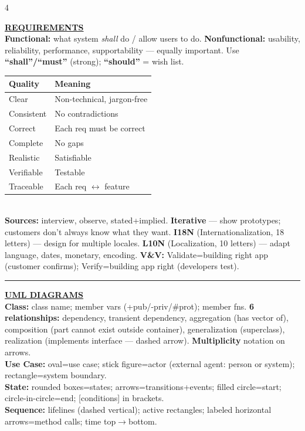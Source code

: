\documentclass[landscape,letterpaper]{article}
\newcommand{\h}[1]{\textbf{#1}}
\newcommand{\hd}[1]{\vspace{1pt}\noindent\textbf{\underline{#1}}\vspace{-1pt}}
\begin{document}
\begin{multicols}{4}
\columnbreak

\hd{REQUIREMENTS}\\[-2pt]
\h{Functional:} what system \emph{shall} do / allow users to do. \h{Nonfunctional:} usability, reliability, performance, supportability — equally important. Use \h{``shall''/``must''} (strong); \h{``should''} = wish list.\\[-2pt]
\vspace{-3pt}
{\fontsize{5.8}{6.6}\selectfont
\begin{tabular}{@{}ll@{}}
\toprule
\textbf{Quality} & \textbf{Meaning}\\
\midrule
Clear & Non-technical, jargon-free\\
Consistent & No contradictions\\
Correct & Each req must be correct\\
Complete & No gaps\\
Realistic & Satisfiable\\
Verifiable & Testable\\
Traceable & Each req $\leftrightarrow$ feature\\
\bottomrule
\end{tabular}
}\\[-2pt]
\h{Sources:} interview, observe, stated+implied. \h{Iterative} — show prototypes; customers don't always know what they want. \h{I18N} (Internationalization, 18 letters) — design for multiple locales. \h{L10N} (Localization, 10 letters) — adapt language, dates, monetary, encoding. \h{V\&V:} Validate=building right app (customer confirms); Verify=building app right (developers test).\\[-2pt]

\vspace{-1pt}\noindent\rule{\columnwidth}{0.2pt}\vspace{-3pt}

\hd{UML DIAGRAMS}\\[-2pt]
\h{Class:} class name; member vars (+pub/-priv/\#prot); member fns. \h{6 relationships:} dependency, transient dependency, aggregation (has vector of), composition (part cannot exist outside container), generalization (superclass), realization (implements interface — dashed arrow). \h{Multiplicity} notation on arrows.\\[-2pt]
\h{Use Case:} oval=use case; stick figure=actor (external agent: person or system); rectangle=system boundary.\\[-2pt]
\h{State:} rounded boxes=states; arrows=transitions+events; filled circle=start; circle-in-circle=end; [conditions] in brackets.\\[-2pt]
\h{Sequence:} lifelines (dashed vertical); active rectangles; labeled horizontal arrows=method calls; time top$\to$bottom.\\[-2pt]


\end{multicols}
\end{document}
